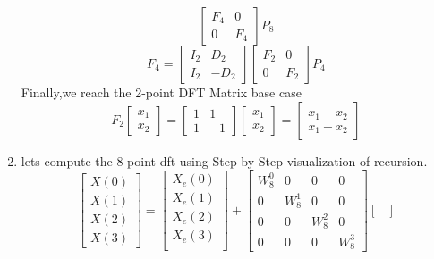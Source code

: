 \documentclass[journal,12pt,twocolumn]{IEEEtran}
\renewcommand\thesection{\arabic{section}}
\begin{document}
\begin{enumerate}[label=\thesection.\arabic*.,ref=\thesection.\theenumi]
\begin{equation}
\begin{bmatrix}
F_{4} & 0 \\
0 & F_{4}
\end{bmatrix}
P_{8}
\end{equation}
\begin{equation}
F_{4}=
\begin{bmatrix}
I_{2} & D_{2} \\
I_{2} & -D_{2}
\end{bmatrix}
\begin{bmatrix}
F_{2} & 0 \\
0 & F_{2}
\end{bmatrix}
P_{4}
\end{equation}
Finally,we reach  the 2-point DFT Matrix base case 
\begin{equation}
F_{2}
\begin{bmatrix}
x_{1} \\
x_{2}
\end{bmatrix}
=
\begin{bmatrix}
1 & 1 \\
1 & -1
\end{bmatrix}
\begin{bmatrix}
x_{1} \\
x_{2}
\end{bmatrix}
=
\begin{bmatrix}
x_{1}+x_{2} \\
x_{1}-x_{2}
\end{bmatrix}
\end{equation}
\item lets compute the 8-point dft using Step by Step visualization of recursion.
\begin{equation}
\begin{bmatrix}
X(0) \\ 
X(1) \\ 
X(2) \\ 
X(3)
\end{bmatrix}
=
\begin{bmatrix}
X_{e}(0) \\ 
X_{e}(1)\\ 
X_{e}(2)\\
X_{e}(3)\\
\end{bmatrix}
+
\begin{bmatrix}
W^{0}_{8} & 0 & 0 & 0\\
0 & W^{1}_{8} & 0 & 0\\
0 & 0 & W^{2}_{8} & 0\\
0 & 0 & 0 & W^{3}_{8}
\end{bmatrix}
\begin{bmatrix}

\end{bmatrix}
\end{equation}
\end{enumerate}
\end{document}
